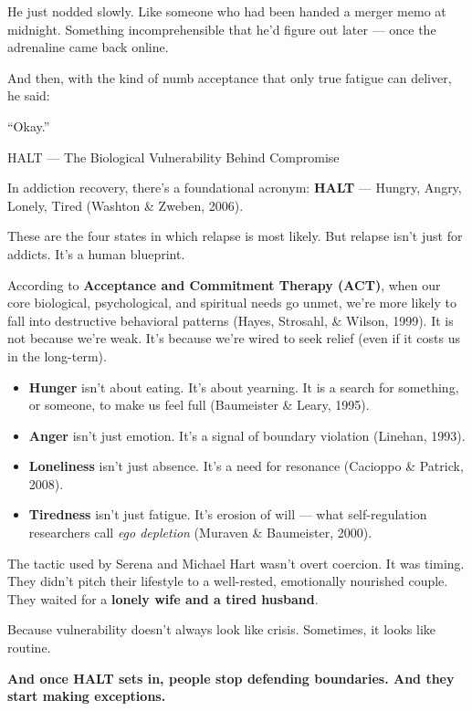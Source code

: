 He just nodded slowly.
Like someone who had been handed a merger memo at midnight.
Something incomprehensible that he’d figure out later — once the adrenaline came back online.

And then, with the kind of numb acceptance that only true fatigue can deliver,
he said:

“Okay.”

\medskip

\begin{PsychologicalSidebar}{HALT — The Biological Vulnerability Behind Compromise}

  In addiction recovery, there’s a foundational acronym: \textbf{HALT} — Hungry, Angry, Lonely, Tired 
  (Washton \& Zweben, 2006).

  \medskip
  
  These are the four states in which relapse is most likely.  
  But relapse isn’t just for addicts. It’s a human blueprint.

  \medskip

  According to \textbf{Acceptance and Commitment Therapy (ACT)}, when our core biological, psychological, 
  and spiritual needs go unmet, we’re more likely to fall into destructive behavioral patterns 
  (Hayes, Strosahl, \& Wilson, 1999).  
  It is not because we’re weak. 
  It’s because we’re wired to seek relief (even if it costs us in the long-term).

  \medskip
 
  \begin{itemize}
    \item \textbf{Hunger} isn’t about eating. It’s about yearning.  
    It is a search for something, or someone, to make us feel full (Baumeister \& Leary, 1995).

    \item \textbf{Anger} isn’t just emotion. It’s a signal of boundary violation (Linehan, 1993).

    \item \textbf{Loneliness} isn’t just absence. It’s a need for resonance (Cacioppo \& Patrick, 2008).

    \item \textbf{Tiredness} isn’t just fatigue. It’s erosion of will  
    — what self-regulation researchers call \textit{ego depletion} (Muraven \& Baumeister, 2000).
  \end{itemize}
  
  \medskip
  
  The tactic used by Serena and Michael Hart wasn’t overt coercion. It was timing.  
  They didn’t pitch their lifestyle to a well-rested, emotionally nourished couple.  
  They waited for a \textbf{lonely wife and a tired husband}.

  \medskip
  
  Because vulnerability doesn’t always look like crisis.  
  Sometimes, it looks like routine.

  \medskip
  
  \textbf{And once HALT sets in, people stop defending boundaries. And they start making exceptions.}

\end{PsychologicalSidebar}

